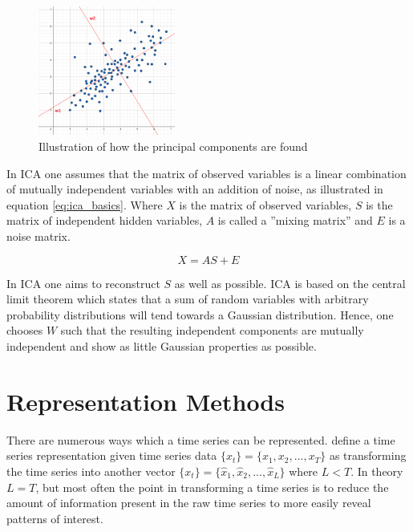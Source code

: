 \begin{figure}
    \begin{center}
    \includegraphics[width=0.4\textwidth]{tsc/pca_illustrated.png}
    \end{center}
    \caption{Illustration of how the principal components are found} 
    \label{fig:pca_illustrated}
\end{figure}

In ICA one assumes that the matrix of observed variables is a linear combination of mutually independent variables with an addition of noise, as illustrated in equation \ref{eq:ica_basics}. 
Where $X$ is the matrix of observed variables, $S$ is the matrix of independent hidden variables, $A$ is called a ''mixing matrix'' and $E$ is a noise matrix.  

\begin{equation}
    X = A S + E
    \label{eq:ica_basics}
\end{equation}

In ICA one aims to reconstruct $S$ as well as possible.
ICA is based on the central limit theorem which states that a sum of random variables with arbitrary probability distributions will tend towards a Gaussian distribution. 
Hence, one chooses $W$ such that the resulting independent components are mutually independent and show as little Gaussian properties as possible.

\section{Representation Methods} \label{sec:rep_methods}
There are numerous ways which a time series can be represented. 
\textcite{tsc_rev} define a time series representation given time series data $\{x_t\} = \{x_1, x_2, ... ,x_T\}$ as transforming the time series into another vector $\{x_t\} = \{\hat{x}_1, \hat{x}_2, ... ,\hat{x}_L\}$ where $L < T$. 
In theory $L=T$, but most often the point in transforming a time series is to reduce the amount of information present in the raw time series to more easily reveal patterns of interest. \bigskip

